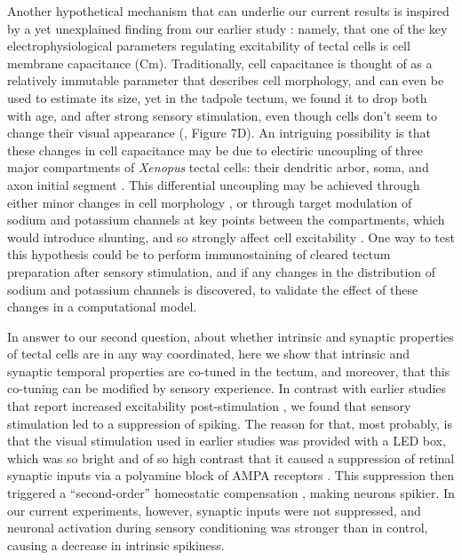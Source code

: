 \documentclass{article}
\begin{document}
Another hypothetical mechanism that can underlie our current results is inspired by a yet unexplained finding from our earlier study \citep{ciarleglio2015}: namely, that one of the key electrophysiological parameters regulating excitability of tectal cells is cell membrane capacitance (Cm). Traditionally, cell capacitance is thought of as a relatively immutable parameter that describes cell morphology, and can even be used to estimate its size, yet in the tadpole tectum, we found it to drop both with age, and after strong sensory stimulation, even though cells don't seem to change their visual appearance (\citealt{ciarleglio2015}, Figure 7D). An intriguing possibility is that these changes in cell capacitance may be due to electiric uncoupling of three major compartments of \textit{Xenopus} tectal cells: their dendritic arbor, soma, and axon initial segment \citep{bollmann2009}. This differential uncoupling may be achieved through either minor changes in cell morphology \citep{leterrier2018axon}, or through target modulation of sodium and potassium channels at key points between the compartments, which would introduce shunting, and so strongly affect cell excitability \citep{grubb2010activity,kuba2010initial}. One way to test this hypothesis could be to perform immunostaining of cleared tectum preparation after sensory stimulation, and if any changes in the distribution of sodium and potassium channels is discovered, to validate the effect of these changes in a computational model.

In answer to our second question, about whether intrinsic and synaptic properties of tectal cells are in any way coordinated, here we show that intrinsic and synaptic temporal properties are co-tuned in the tectum, and moreover, that this co-tuning can be modified by sensory experience. In contrast with earlier studies that report increased excitability post-stimulation \citep{aizenman2003,dong2009,ciarleglio2015}, we found that sensory stimulation led to a suppression of spiking. The reason for that, most probably, is that the visual stimulation used in earlier studies was provided with a LED box, which was so bright and of so high contrast that it caused a suppression of retinal synaptic inputs via a polyamine block of AMPA receptors \citep{aizenman2003}. This suppression then triggered a “second-order” homeostatic compensation \citep{turrigiano2011,tien2018}, making neurons spikier. In our current experiments, however, synaptic inputs were not suppressed, and neuronal activation during sensory conditioning was stronger than in control, causing a decrease in intrinsic spikiness.
\end{document}
